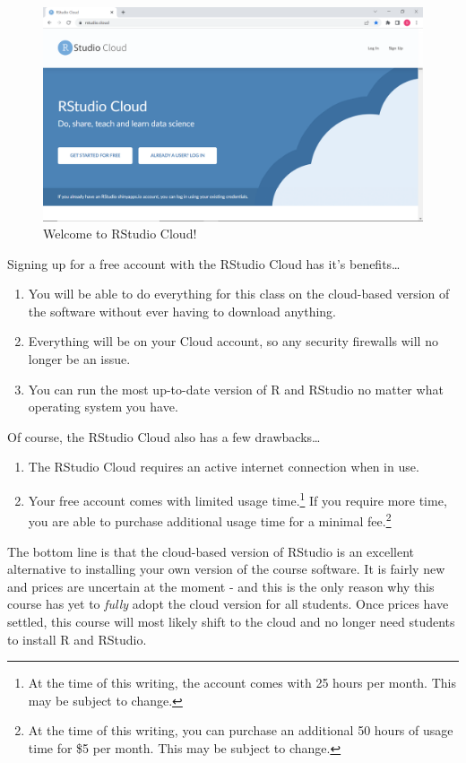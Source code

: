 \documentclass[
]{book}
\begin{document}
\begin{figure}

{\centering \includegraphics[width=0.75\linewidth]{images/RCloud} 

}

\caption{Welcome to RStudio Cloud!}\label{fig:unnamed-chunk-28}
\end{figure}

Signing up for a free account with the RStudio Cloud has it's benefits\ldots{}

\begin{enumerate}
\def\labelenumi{\arabic{enumi}.}
\item
  You will be able to do everything for this class on the cloud-based version of the software without ever having to download anything.
\item
  Everything will be on your Cloud account, so any security firewalls will no longer be an issue.
\item
  You can run the most up-to-date version of R and RStudio no matter what operating system you have.
\end{enumerate}

Of course, the RStudio Cloud also has a few drawbacks\ldots{}

\begin{enumerate}
\def\labelenumi{\arabic{enumi}.}
\item
  The RStudio Cloud requires an active internet connection when in use.
\item
  Your free account comes with limited usage time.\footnote{At the time of this writing, the account comes with 25 hours per month. This may be subject to change.} If you require more time, you are able to purchase additional usage time for a minimal fee.\footnote{At the time of this writing, you can purchase an additional 50 hours of usage time for \$5 per month. This may be subject to change.}
\end{enumerate}

The bottom line is that the cloud-based version of RStudio is an excellent alternative to installing your own version of the course software. It is fairly new and prices are uncertain at the moment - and this is the only reason why this course has yet to \emph{fully} adopt the cloud version for all students. Once prices have settled, this course will most likely shift to the cloud and no longer need students to install R and RStudio.
\end{document}

